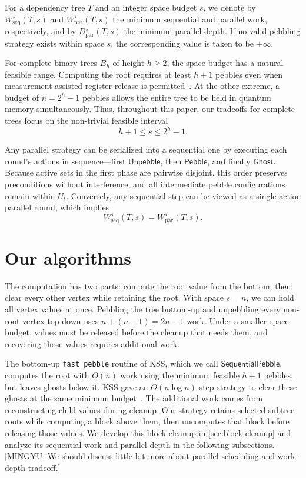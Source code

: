 \documentclass[11pt]{article}
\theoremstyle{definition}
\theoremstyle{remark}
\newcommand{\Peb}{\mathsf{Pebble}}
\newcommand{\Unp}{\mathsf{Unpebble}}
\newcommand{\Ghost}{\mathsf{Ghost}}
\newcommand{\Fast}{\mathsf{SequentialPebble}}
\newcommand{\Wseq}{W_{\mathrm{seq}}}
\newcommand{\Wpar}{W_{\mathrm{par}}}
\newcommand{\Dpar}{D_{\mathrm{par}}}
\newcommand{\mingyu}[1]{{\color{magenta}\footnotesize [MINGYU: #1]}} %
\begin{document}
For a dependency tree $T$ and an integer space budget $s$, we denote by $\Wseq^\star(T,s)$ and $\Wpar^\star(T,s)$ the minimum sequential and parallel work, respectively, and by $\Dpar^\star(T,s)$ the minimum parallel depth. If no valid pebbling strategy exists within space $s$, the corresponding value is taken to be $+\infty$.

For complete binary trees $B_h$ of height $h \ge 2$, the space budget has a natural feasible range. Computing the root requires at least $h+1$ pebbles even when measurement-assisted register release is permitted~\cite{Cook1973,KSS2025}. At the other extreme, a budget of $n = 2^h-1$ pebbles allows the entire tree to be held in quantum memory simultaneously. Thus, throughout this paper, our tradeoffs for complete trees focus on the non-trivial feasible interval
\begin{equation}
    h+1 \le s \le 2^h-1.
\end{equation}

Any parallel strategy can be serialized into a sequential one by executing each round's actions in sequence—first $\Unp$, then $\Peb$, and finally $\Ghost$. Because active sets in the first phase are pairwise disjoint, this order preserves preconditions without interference, and all intermediate pebble configurations remain within $U_t$. Conversely, any sequential step can be viewed as a single-action parallel round, which implies
\begin{equation}
    \Wseq^\star(T,s) = \Wpar^\star(T,s).
    \label{eq:serialize}
\end{equation}



\section{Our algorithms}
\label{sec:main-algorithms}

The computation has two parts: compute the root value from the bottom, then clear every other vertex while retaining the root. With space $s=n$, we can hold all vertex values at once. Pebbling the tree bottom-up and unpebbling every non-root vertex top-down uses $n+(n-1)=2n-1$ work. Under a smaller space budget, values must be released before the cleanup that needs them, and recovering those values requires additional work.

The bottom-up \texttt{fast\_pebble} routine of KSS, which we call $\Fast$, computes the root with $O(n)$ work using the minimum feasible $h+1$ pebbles, but leaves ghosts below it. KSS gave an $O(n\log n)$-step strategy to clear these ghosts at the same minimum budget~\cite[Theorem~5.5]{KSS2025}. The additional work comes from reconstructing child values during cleanup. Our strategy retains selected subtree roots while computing a block above them, then uncomputes that block before releasing those values. We develop this block cleanup in \cref{sec:block-cleanup} and analyze its sequential work and parallel depth in the following subsections. \mingyu{We should discuss little bit more about parallel scheduling and work-depth tradeoff.}
\end{document}
